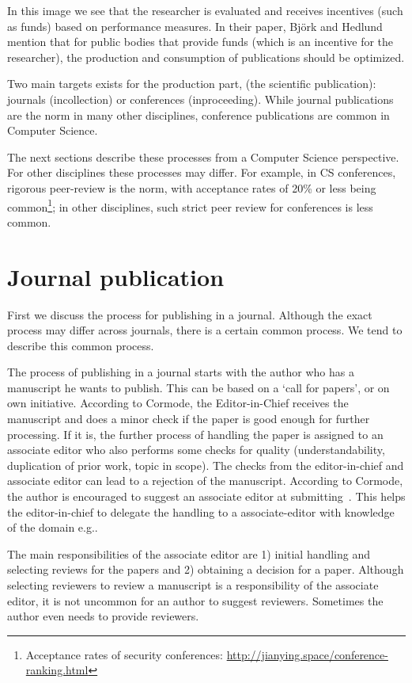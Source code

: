 \documentclass{ou-report}
\begin{document}
In this image we see that the researcher is evaluated and receives incentives 
(such as funds) based on performance measures. In their paper,  Bj\"ork and 
Hedlund mention that for public bodies that provide funds (which is an incentive 
for the researcher), the production and consumption of publications should be 
optimized.

Two main targets exists for the production part, (the scientific publication): 
journals (incollection) or 
conferences (inproceeding). While journal publications are the norm in many 
other disciplines, conference publications are common in Computer Science.

The next sections describe these processes from a Computer Science perspective. 
For other disciplines these processes may differ. For example, in CS 
conferences, rigorous peer-review is the norm, with acceptance rates of 20\% or 
less being common\footnote{Acceptance rates of security conferences: \url{http://jianying.space/conference-ranking.html}}; in other disciplines, such strict peer review for conferences is
less common.

\section{Journal publication}

First we discuss the process for publishing in a journal. Although the 
exact process may differ across journals, there is a certain common process. We 
tend to describe this common process.

The process of publishing in a journal starts with the author who has a
manuscript he wants to publish. This can be based on a `call for papers', or on
own initiative. According to Cormode, the Editor-in-Chief receives the
manuscript and does a minor check if the paper is good enough for further
processing. If it is, the further process of handling the paper is assigned to
an associate editor 
who also performs some checks for quality (understandability, duplication of 
prior work, topic in scope). The checks from the editor-in-chief and associate 
editor can lead to a rejection of the manuscript. According to Cormode, the 
author is encouraged to suggest an associate editor at submitting~\cite{C2013}.
This helps the editor-in-chief to delegate the handling to a associate-editor 
with knowledge of the domain e.g..

The main responsibilities of the associate editor are 1) initial handling and 
selecting reviews for the papers and 2) obtaining a decision for a paper. 
Although selecting reviewers to review a manuscript is a responsibility of the 
associate editor, it is not uncommon for an author to suggest reviewers. 
Sometimes the author even needs to provide reviewers.
\end{document}
